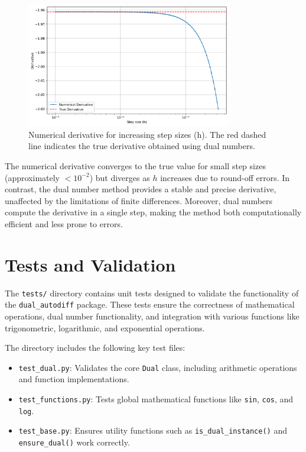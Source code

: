 \documentclass[a4paper,12pt]{article}
\begin{document}
\begin{figure}[h!]
    \centering
    \includegraphics[width=0.8\textwidth]{convergence_derivative.png}
    \caption{Numerical derivative for increasing step sizes (h). The red dashed line indicates the true derivative obtained using dual numbers.}
    \label{fig:convergence_derivative}
\end{figure}

The numerical derivative converges to the true value for small step sizes (approximately \(< 10^{-2}\)) but diverges as \(h\) increases due to round-off errors. In contrast, the dual number method provides a stable and precise derivative, unaffected by the limitations of finite differences. Moreover, dual numbers compute the derivative in a single step, making the method both computationally efficient and less prone to errors.


\section{Tests and Validation}

The \texttt{tests/} directory contains unit tests designed to validate the functionality of the \texttt{dual\_autodiff} package. These tests ensure the correctness of mathematical operations, dual number functionality, and integration with various functions like trigonometric, logarithmic, and exponential operations.

The directory includes the following key test files:
\begin{itemize}
    \item \texttt{test\_dual.py}: Validates the core \texttt{Dual} class, including arithmetic operations and function implementations.
    \item \texttt{test\_functions.py}: Tests global mathematical functions like \texttt{sin}, \texttt{cos}, and \texttt{log}.
    \item \texttt{test\_base.py}: Ensures utility functions such as \texttt{is\_dual\_instance()} and \texttt{ensure\_dual()} work correctly.
\end{itemize}
\end{document}

